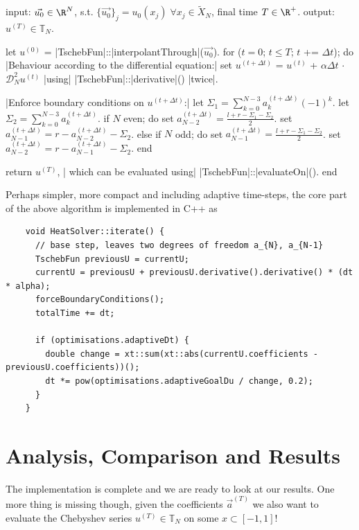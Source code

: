 \documentclass[12pt, a4paper]{article}
\newcommand{\chebyshev}{Chebyshev\xspace}
\begin{document}
  \begin{algorithm}[language=pseudo,caption={\centering Our final solving algorithm}]
input: $\vec{u_0} \in \R^N$, s.t. $\{\vec{u_0}\}_j = u_0(x_j) \; \forall x_j \in \tilde{X}_N$, final time $T \in \R^+$.
output: $u^{(T)} \in \mathbb{T}_N$.

let $u^{(0)}$ = |\color{themecolor3}TschebFun|::|\color{themecolor2}interpolantThrough|($\vec{u_0}$).
for ($t = 0$; $t \le T$; $t$ += $\Delta t$); do
  |\rm\color{gray}Behaviour according to the differential equation:|
  set $u^{(t+\Delta t)}$ = $u^{(t)}$ + $\alpha \Delta t$ $\cdot$ $\mathcal{D}_N^2 u^{(t)}$ |\rm\color{gray}using| |\color{themecolor3}TschebFun|::|\color{themecolor2}derivative|() |\rm\color{gray}twice|.

  |\rm\color{gray}Enforce boundary conditions on $u^{(t+\Delta t)}$:|
  let $\Sigma_1 = \sum_{k=0}^{N-3} a_k^{(t+\Delta t)} (-1)^k$.
  let $\Sigma_2 = \sum_{k=0}^{N-3} a_k^{(t+\Delta t)}$.
  if $N$ even; do
    set $a_{N-2}^{(t+\Delta t)} = \frac{l+r-\Sigma_1-\Sigma_2}{2}$.
    set $a_{N-1}^{(t+\Delta t)} = r - a_{N-2}^{(t+\Delta t)} - \Sigma_2$.
  else if $N$ odd; do
    set $a_{N-1}^{(t+\Delta t)} = \frac{l+r-\Sigma_1-\Sigma_2}{2}$.
    set $a_{N-2}^{(t+\Delta t)} = r - a_{N-1}^{(t+\Delta t)} - \Sigma_2$.
  end

  return $u^{(T)}$, |\rm\color{gray} which can be evaluated using| |\color{themecolor3}TschebFun|::|\color{themecolor2}evaluateOn|().
end
  \end{algorithm}

  Perhaps simpler, more compact and including adaptive time-steps, the core part of the above algorithm is implemented in C++ as
  \begin{verbatim}
    void HeatSolver::iterate() {
      // base step, leaves two degrees of freedom a_{N}, a_{N-1}
      TschebFun previousU = currentU;
      currentU = previousU + previousU.derivative().derivative() * (dt * alpha);
      forceBoundaryConditions();
      totalTime += dt;

      if (optimisations.adaptiveDt) {
        double change = xt::sum(xt::abs(currentU.coefficients - previousU.coefficients))();
        dt *= pow(optimisations.adaptiveGoalDu / change, 0.2);
      }
    }
  \end{verbatim}

  \section{Analysis, Comparison and Results}
  The implementation is complete and we are ready to look at our results.
  One more thing is missing though, given the coefficients $\vec{a}^{(T)}$ we also want to evaluate the \chebyshev series $u^{(T)} \in \mathbb{T}_N$ on some $x \subset [-1, 1]$!
\end{document}
